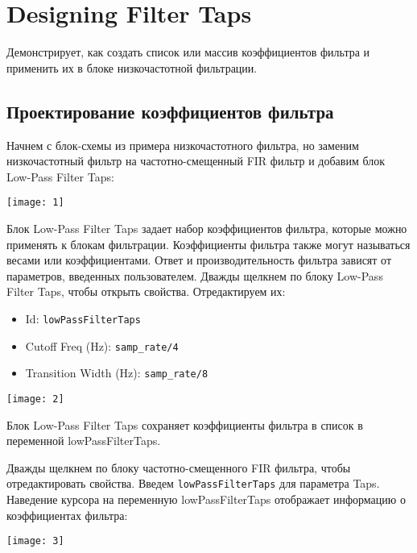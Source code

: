 \section{Designing Filter Taps}

Демонстрирует, как создать список или массив коэффициентов фильтра и применить их в блоке низкочастотной фильтрации.

\subsection{Проектирование коэффициентов фильтра}

Начнем с блок-схемы из примера низкочастотного фильтра, но заменим низкочастотный фильтр на частотно-смещенный FIR фильтр и добавим блок Low-Pass Filter Taps:

\begin{center}
    \texttt{[image: 1]}
\end{center}

Блок Low-Pass Filter Taps задает набор коэффициентов фильтра, которые можно применять к блокам фильтрации. Коэффициенты фильтра также могут называться весами или коэффициентами. Ответ и производительность фильтра зависят от параметров, введенных пользователем. Дважды щелкнем по блоку Low-Pass Filter Taps, чтобы открыть свойства. Отредактируем их:

\begin{itemize}
    \item Id: \verb|lowPassFilterTaps|
    \item Cutoff Freq (Hz): \verb|samp_rate/4|
    \item Transition Width (Hz): \verb|samp_rate/8|
\end{itemize}

\begin{center}
    \texttt{[image: 2]}
\end{center}

Блок Low-Pass Filter Taps сохраняет коэффициенты фильтра в список в переменной lowPassFilterTaps.

Дважды щелкнем по блоку частотно-смещенного FIR фильтра, чтобы отредактировать свойства. Введем \verb|lowPassFilterTaps| для параметра Taps. Наведение курсора на переменную lowPassFilterTaps отображает информацию о коэффициентах фильтра:

\begin{center}
    \texttt{[image: 3]}
\end{center}

